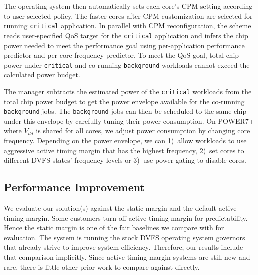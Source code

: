 The operating system then automatically sets each core's CPM setting according to user-selected policy. The faster cores after CPM customization are selected for running \texttt{critical} application. In parallel with CPM reconfiguration, the scheme reads user-specified QoS target for the \texttt{critical} application and infers the chip power needed to meet the performance goal using per-application performance predictor and per-core frequency predictor. To meet the QoS goal, total chip power under \texttt{critical} and co-running \texttt{background} workloads cannot exceed the calculated power budget.

The manager subtracts the estimated power of the \texttt{critical} workloads from the total chip power budget to get the power envelope available for the co-running \texttt{background} jobs. The \texttt{background} jobs can then be scheduled to the same chip under this envelope by carefully tuning their power consumption. On POWER7+ where $V_{dd}$ is shared for all cores, we adjust power consumption by changing core frequency. Depending on the power envelope, we can 1)~allow workloads to use aggressive active timing margin that has the highest frequency, 2)~set cores to different DVFS states' frequency levels or 3)~use power-gating to disable cores.

\subsection{Performance Improvement}
\label{sec:process:schedule:result}


We evaluate our solution(s) against the static margin and the default active timing margin. Some customers turn off active timing margin for predictability. Hence the static margin is one of the fair baselines we compare with for evaluation. The system is running the stock DVFS operating system governors that already strive to improve system efficiency. Therefore, our results include that comparison implicitly. Since active timing margin systems are still new and rare, there is little other prior work to compare against directly.

